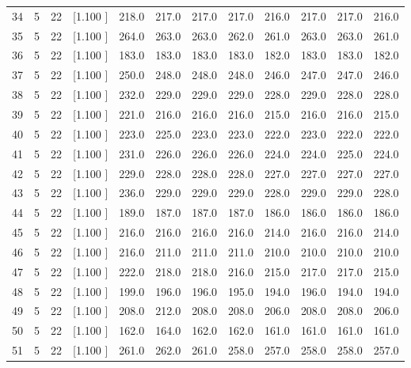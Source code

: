 \documentclass[12pt,a4paper]{article}
\begin{document}
\begin{center}
{\begin{tabular}{r r r r r r r r r r r r}
  34&  5& 22&[1.100     ]&   218.0&   217.0&   217.0&   217.0&   216.0&   217.0&   217.0&   216.0\\[-0.02in]
  35&  5& 22&[1.100     ]&   264.0&   263.0&   263.0&   262.0&   261.0&   263.0&   263.0&   261.0\\[-0.02in]
  36&  5& 22&[1.100     ]&   183.0&   183.0&   183.0&   183.0&   182.0&   183.0&   183.0&   182.0\\[-0.02in]
  37&  5& 22&[1.100     ]&   250.0&   248.0&   248.0&   248.0&   246.0&   247.0&   247.0&   246.0\\[-0.02in]
  38&  5& 22&[1.100     ]&   232.0&   229.0&   229.0&   229.0&   228.0&   229.0&   228.0&   228.0\\[-0.02in]
  39&  5& 22&[1.100     ]&   221.0&   216.0&   216.0&   216.0&   215.0&   216.0&   216.0&   215.0\\[-0.02in]
  40&  5& 22&[1.100     ]&   223.0&   225.0&   223.0&   223.0&   222.0&   223.0&   222.0&   222.0\\[-0.02in]
  41&  5& 22&[1.100     ]&   231.0&   226.0&   226.0&   226.0&   224.0&   224.0&   225.0&   224.0\\[-0.02in]
  42&  5& 22&[1.100     ]&   229.0&   228.0&   228.0&   228.0&   227.0&   227.0&   227.0&   227.0\\[-0.02in]
  43&  5& 22&[1.100     ]&   236.0&   229.0&   229.0&   229.0&   228.0&   229.0&   229.0&   228.0\\[-0.02in]
  44&  5& 22&[1.100     ]&   189.0&   187.0&   187.0&   187.0&   186.0&   186.0&   186.0&   186.0\\[-0.02in]
  45&  5& 22&[1.100     ]&   216.0&   216.0&   216.0&   216.0&   214.0&   216.0&   216.0&   214.0\\[-0.02in]
  46&  5& 22&[1.100     ]&   216.0&   211.0&   211.0&   211.0&   210.0&   210.0&   210.0&   210.0\\[-0.02in]
  47&  5& 22&[1.100     ]&   222.0&   218.0&   218.0&   216.0&   215.0&   217.0&   217.0&   215.0\\[-0.02in]
  48&  5& 22&[1.100     ]&   199.0&   196.0&   196.0&   195.0&   194.0&   196.0&   194.0&   194.0\\[-0.02in]
  49&  5& 22&[1.100     ]&   208.0&   212.0&   208.0&   208.0&   206.0&   208.0&   208.0&   206.0\\[-0.02in]
  50&  5& 22&[1.100     ]&   162.0&   164.0&   162.0&   162.0&   161.0&   161.0&   161.0&   161.0\\[-0.02in]
  51&  5& 22&[1.100     ]&   261.0&   262.0&   261.0&   258.0&   257.0&   258.0&   258.0&   257.0\\[-0.02in]

\end{tabular}}
\end{center}
\end{document}
